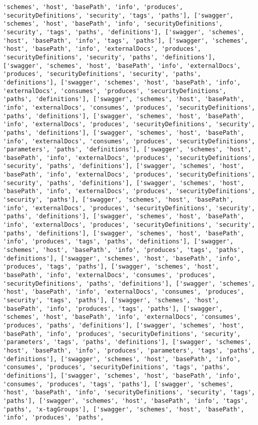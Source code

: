 \documentclass[11pt]{article}
\begin{document}
\begin{Verbatim}[commandchars=\\\{\}]
'schemes', 'host', 'basePath', 'info', 'produces', 'securityDefinitions', 'security', 'tags', 'paths'], ['swagger', 'schemes', 'host', 'basePath', 'info', 'securityDefinitions', 'security', 'tags', 'paths', 'definitions'], ['swagger', 'schemes', 'host', 'basePath', 'info', 'tags', 'paths'], ['swagger', 'schemes', 'host', 'basePath', 'info', 'externalDocs', 'produces', 'securityDefinitions', 'security', 'paths', 'definitions'], ['swagger', 'schemes', 'host', 'basePath', 'info', 'externalDocs', 'produces', 'securityDefinitions', 'security', 'paths', 'definitions'], ['swagger', 'schemes', 'host', 'basePath', 'info', 'externalDocs', 'consumes', 'produces', 'securityDefinitions', 'paths', 'definitions'], ['swagger', 'schemes', 'host', 'basePath', 'info', 'externalDocs', 'consumes', 'produces', 'securityDefinitions', 'paths', 'definitions'], ['swagger', 'schemes', 'host', 'basePath', 'info', 'externalDocs', 'produces', 'securityDefinitions', 'security', 'paths', 'definitions'], ['swagger', 'schemes', 'host', 'basePath', 'info', 'externalDocs', 'consumes', 'produces', 'securityDefinitions', 'parameters', 'paths', 'definitions'], ['swagger', 'schemes', 'host', 'basePath', 'info', 'externalDocs', 'produces', 'securityDefinitions', 'security', 'paths', 'definitions'], ['swagger', 'schemes', 'host', 'basePath', 'info', 'externalDocs', 'produces', 'securityDefinitions', 'security', 'paths', 'definitions'], ['swagger', 'schemes', 'host', 'basePath', 'info', 'externalDocs', 'produces', 'securityDefinitions', 'security', 'paths'], ['swagger', 'schemes', 'host', 'basePath', 'info', 'externalDocs', 'produces', 'securityDefinitions', 'security', 'paths', 'definitions'], ['swagger', 'schemes', 'host', 'basePath', 'info', 'externalDocs', 'produces', 'securityDefinitions', 'security', 'paths', 'definitions'], ['swagger', 'schemes', 'host', 'basePath', 'info', 'produces', 'tags', 'paths', 'definitions'], ['swagger', 'schemes', 'host', 'basePath', 'info', 'produces', 'tags', 'paths', 'definitions'], ['swagger', 'schemes', 'host', 'basePath', 'info', 'produces', 'tags', 'paths'], ['swagger', 'schemes', 'host', 'basePath', 'info', 'externalDocs', 'consumes', 'produces', 'securityDefinitions', 'paths', 'definitions'], ['swagger', 'schemes', 'host', 'basePath', 'info', 'externalDocs', 'consumes', 'produces', 'security', 'tags', 'paths'], ['swagger', 'schemes', 'host', 'basePath', 'info', 'produces', 'tags', 'paths'], ['swagger', 'schemes', 'host', 'basePath', 'info', 'externalDocs', 'consumes', 'produces', 'paths', 'definitions'], ['swagger', 'schemes', 'host', 'basePath', 'info', 'produces', 'securityDefinitions', 'security', 'parameters', 'tags', 'paths', 'definitions'], ['swagger', 'schemes', 'host', 'basePath', 'info', 'produces', 'parameters', 'tags', 'paths', 'definitions'], ['swagger', 'schemes', 'host', 'basePath', 'info', 'consumes', 'produces', 'securityDefinitions', 'tags', 'paths', 'definitions'], ['swagger', 'schemes', 'host', 'basePath', 'info', 'consumes', 'produces', 'tags', 'paths'], ['swagger', 'schemes', 'host', 'basePath', 'info', 'securityDefinitions', 'security', 'tags', 'paths'], ['swagger', 'schemes', 'host', 'basePath', 'info', 'tags', 'paths', 'x-tagGroups'], ['swagger', 'schemes', 'host', 'basePath', 'info', 'produces', 'paths', 
\end{Verbatim}
\end{document}
